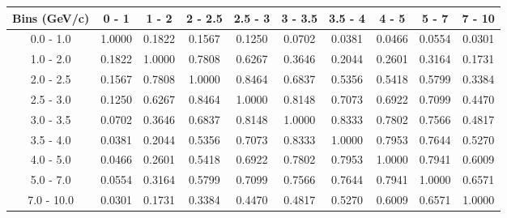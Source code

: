 \documentclass[aps, prd, reprint,showpacs,  preprintnumbers,amsmath,amssymb,superscriptaddress, nofootinbib]{revtex4-1}
\makeatletter
\renewenvironment{table}
  {\def\@captype{table}}
  {}
\makeatother
\begin{document}
\begin{table}
\centering
\begin{tabular}{cccccccccc}
\hline
Bins (GeV/c) & 0 - 1 & 1 - 2 & 2 - 2.5 & 2.5 - 3 & 3 - 3.5 & 3.5 - 4 & 4 - 5 & 5 - 7 & 7 - 10 \\ 
\hline
0.0 - 1.0 & 1.0000 & 0.1822 & 0.1567 & 0.1250 & 0.0702 & 0.0381 & 0.0466 & 0.0554 & 0.0301 \\ 
1.0 - 2.0 & 0.1822 & 1.0000 & 0.7808 & 0.6267 & 0.3646 & 0.2044 & 0.2601 & 0.3164 & 0.1731 \\ 
2.0 - 2.5 & 0.1567 & 0.7808 & 1.0000 & 0.8464 & 0.6837 & 0.5356 & 0.5418 & 0.5799 & 0.3384 \\ 
2.5 - 3.0 & 0.1250 & 0.6267 & 0.8464 & 1.0000 & 0.8148 & 0.7073 & 0.6922 & 0.7099 & 0.4470 \\ 
3.0 - 3.5 & 0.0702 & 0.3646 & 0.6837 & 0.8148 & 1.0000 & 0.8333 & 0.7802 & 0.7566 & 0.4817 \\ 
3.5 - 4.0 & 0.0381 & 0.2044 & 0.5356 & 0.7073 & 0.8333 & 1.0000 & 0.7953 & 0.7644 & 0.5270 \\ 
4.0 - 5.0 & 0.0466 & 0.2601 & 0.5418 & 0.6922 & 0.7802 & 0.7953 & 1.0000 & 0.7941 & 0.6009 \\ 
5.0 - 7.0 & 0.0554 & 0.3164 & 0.5799 & 0.7099 & 0.7566 & 0.7644 & 0.7941 & 1.0000 & 0.6571 \\ 
7.0 - 10.0 & 0.0301 & 0.1731 & 0.3384 & 0.4470 & 0.4817 & 0.5270 & 0.6009 & 0.6571 & 1.0000 \\ 
\hline
\hline
\end{tabular}
\caption{Correlation matrix for bins of $d\sigma/dp_\mu$.}
\label{tb:pip_mup_cov}
\end{table}

\vspace{0.7cm}
\end{document}
